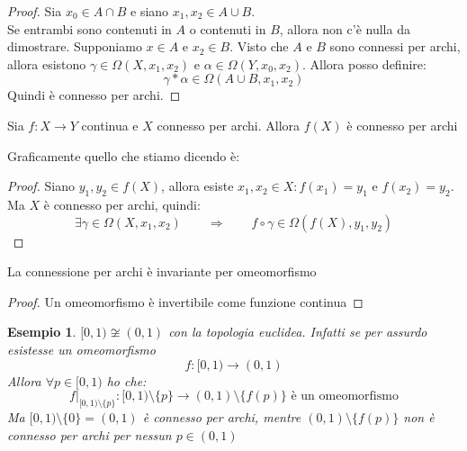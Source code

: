 \documentclass[11pt,a4paper,twoside]{article}
\newtheorem{es}{Esempio}
\theoremstyle{definition}
\begin{document}
\begin{proof}
	Sia $x_0 \in A \cap B$ e siano $x_1, x_2 \in A \cup B$.\\
	Se entrambi sono contenuti in $A$ o contenuti in $B$, allora non c'è nulla da dimostrare. Supponiamo $x \in A$ e $x_2 \in B$. Visto che $A$ e $B$ sono connessi per archi, allora esistono $\gamma \in \Omega(X, x_1,x_2)$ e $\alpha \in \Omega(Y, x_0, x_2)$. Allora posso definire:
	\[ \gamma * \alpha \in \Omega(A \cup B, x_1, x_2) \]
	Quindi è connesso per archi.
\end{proof}

\begin{prop}{}{}
	Sia $f: X \to Y$ continua e $X$ connesso per archi. Allora $f(X)$ è connesso per archi
\end{prop}
Graficamente quello che stiamo dicendo è:
\begin{center}
\end{center}
\begin{proof}
	Siano $y_1, y_2 \in f(X)$, allora esiste $x_1,x_2 \in X: f(x_1) = y_1$ e $f(x_2) = y_2$. Ma $X$ è connesso per archi, quindi:
	\[\exists \gamma \in \Omega(X, x_1, x_2)\qquad \Rightarrow \qquad f \circ \gamma \in \Omega(f(X), y_1, y_2)\]
\end{proof}

\begin{cor}{}{}
	La connessione per archi è invariante per omeomorfismo
\end{cor}

\begin{proof}
	Un omeomorfismo è invertibile come funzione continua
\end{proof}

\begin{es}
	$[0,1) \not \cong (0,1)$ con la topologia euclidea. Infatti se per assurdo esistesse un omeomorfismo
	\[f:[0,1) \to (0,1)\]
	Allora $\forall p \in [0,1)$ ho che:
	\[ f|_{[0,1)\setminus \{p\}}: [0,1)\setminus \{p\} \to (0,1) \setminus \{f(p)\} \text{ è un omeomorfismo}\]
	Ma $[0,1)\setminus \{0\} = (0,1)$ è connesso per archi, mentre $(0,1)\setminus \{f(p)\}$ non è connesso per archi per nessun $p \in (0,1)$
\end{es}
\end{document}
